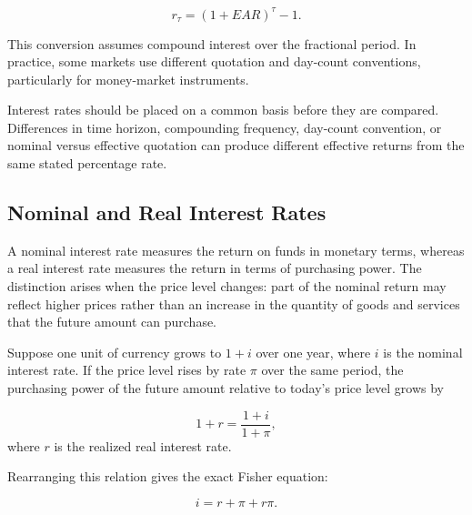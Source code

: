 \begin{equation}
r_{\tau}=(1+EAR)^{\tau}-1.
\label{eq:ch6-fractional-period-rate}
\end{equation}

This conversion assumes compound interest over the fractional period. In practice, some markets use different quotation and day-count conventions, particularly for money-market instruments.

\begin{tcolorbox}[
enhanced,
breakable,
colback=white,
colframe=FinanceBlue,
boxrule=0.7pt,
sharp corners,
borderline west={2.2pt}{0pt}{FinanceBlue},
title=\textbf{Financial Perspective: Compare Like with Like},
coltitle=white,
colbacktitle=FinanceBlue,
fonttitle=\bfseries,
before skip=1.2em,
after skip=1.2em
]

Interest rates should be placed on a common basis before they are compared. Differences in time horizon, compounding frequency, day-count convention, or nominal versus effective quotation can produce different effective returns from the same stated percentage rate.

\end{tcolorbox}


\subsection{Nominal and Real Interest Rates}

A nominal interest rate measures the return on funds in monetary terms, whereas a real interest rate measures the return in terms of purchasing power. The distinction arises when the price level changes: part of the nominal return may reflect higher prices rather than an increase in the quantity of goods and services that the future amount can purchase.

Suppose one unit of currency grows to $1+i$ over one year, where $i$ is the nominal interest rate. If the price level rises by rate $\pi$ over the same period, the purchasing power of the future amount relative to today's price level grows by

\begin{equation}
1+r
=
\frac{1+i}{1+\pi},
\label{eq:ch6-fisher-exact}
\end{equation}
where $r$ is the realized real interest rate.

Rearranging this relation gives the exact Fisher equation:

\begin{equation}
i=r+\pi+r\pi.
\label{eq:ch6-fisher-expanded}
\end{equation}

